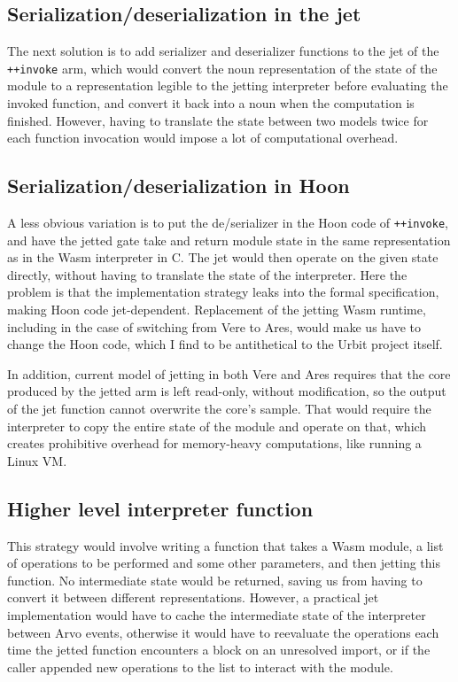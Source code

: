 \documentclass[twoside]{article}
\begin{document}
\subsection{Serialization/deserialization in the jet}

The next solution is to add serializer and deserializer functions to the jet of the \lstinline[style=inlinecode]{++invoke} arm, which would convert the noun representation of the state of the module to a representation legible to the jetting interpreter before evaluating the invoked function, and convert it back into a noun when the computation is finished. However, having to translate the state between two models twice for each function invocation would impose a lot of computational overhead.

\subsection{Serialization/deserialization in Hoon}

A less obvious variation is to put the de/serializer in the Hoon code of \lstinline[style=inlinecode]{++invoke}, and have the jetted gate take and return module state in the same representation as in the Wasm interpreter in C. The jet would then operate on the given state directly, without having to translate the state of the interpreter. Here the problem is that the implementation strategy leaks into the formal specification, making Hoon code jet-dependent. Replacement of the jetting Wasm runtime, including in the case of switching from Vere to Ares, would make us have to change the Hoon code, which I find to be antithetical to the Urbit project itself.

In addition, current model of jetting in both Vere and Ares requires that the core produced by the jetted arm is left read-only, without modification, so the output of the jet function cannot overwrite the core's sample. That would require the interpreter to copy the entire state of the module and operate on that, which creates prohibitive overhead for memory-heavy computations, like running a Linux VM.

\subsection{Higher level interpreter function}

This strategy would involve writing a function that takes a Wasm module, a list of operations to be performed and some other parameters, and then jetting this function. No intermediate state would be returned, saving us from having to convert it between different representations. However, a practical jet implementation would have to cache the intermediate state of the interpreter between Arvo events, otherwise it would have to reevaluate the operations each time the jetted function encounters a block on an unresolved import, or if the caller appended new operations to the list to interact with the module.
\end{document}

